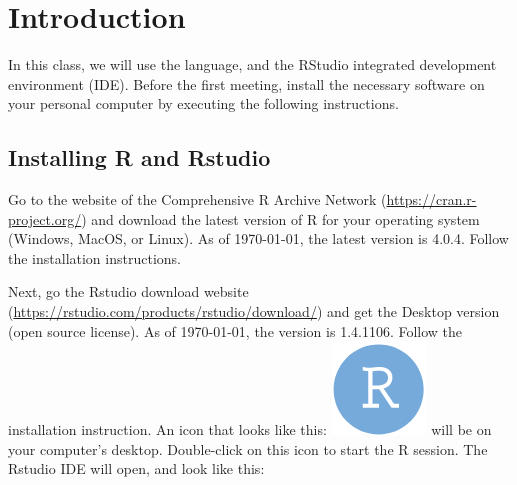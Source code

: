 \hypertarget{intro}{%
\chapter{Introduction}\label{intro}}

In this class, we will use the \R language, and the RStudio integrated development environment (IDE). Before the first meeting, install the necessary software on your personal computer by executing the following instructions.

\hypertarget{installing-r-and-rstudio}{%
\section{Installing R and Rstudio}\label{installing-r-and-rstudio}}

Go to the website of the Comprehensive R Archive Network (\url{https://cran.r-project.org/}) and download the latest version of R for your operating system (Windows, MacOS, or Linux). As of \today, the latest version is 4.0.4. Follow the installation instructions.

Next, go the Rstudio download website
(\url{https://rstudio.com/products/rstudio/download/}) and get the Desktop version
(open source license). As of \today, the version is 1.4.1106. Follow the
installation instruction. An icon that looks like this:
\includegraphics[width=\textwidth,height=0.025\textheight]{images/RstudioLogo.png}
will be on your computer's desktop. Double-click on this icon to start the R session. The Rstudio IDE will open, and look like this:

